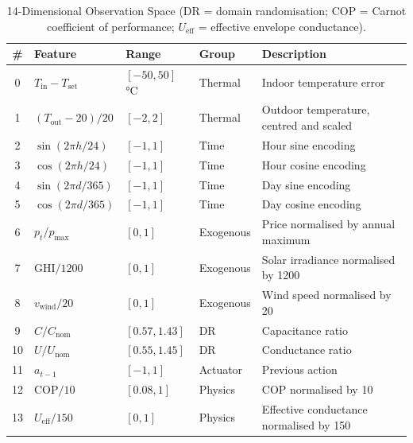 \documentclass[conference]{IEEEtran}
\begin{document}
\begin{table}[!t]
  \centering
  \small
  \caption{14-Dimensional Observation Space (DR = domain randomisation;
  COP = Carnot coefficient of performance;
  $U_{\text{eff}}$ = effective envelope conductance).}
  \label{tab:obs}
  \begin{tabular}{cllll}
    \toprule
    \textbf{\#} & \textbf{Feature} & \textbf{Range} & \textbf{Group} & \textbf{Description} \\
    \midrule
    0  & $T_{\text{in}} - T_{\text{set}}$  & $[-50,50]$\,\si{\degreeCelsius}  & Thermal   & Indoor temperature error \\
    1  & $(T_{\text{out}}-20)/20$           & $[-2,2]$                          & Thermal   & Outdoor temperature, centred and scaled \\
    2  & $\sin(2\pi h/24)$                  & $[-1,1]$                          & Time      & Hour sine encoding \\
    3  & $\cos(2\pi h/24)$                  & $[-1,1]$                          & Time      & Hour cosine encoding \\
    4  & $\sin(2\pi d/365)$                 & $[-1,1]$                          & Time      & Day sine encoding \\
    5  & $\cos(2\pi d/365)$                 & $[-1,1]$                          & Time      & Day cosine encoding \\
    6  & $p_t / p_{\max}$                   & $[0,1]$                           & Exogenous & Price normalised by annual maximum \\
    7  & GHI$/1200$                          & $[0,1]$                           & Exogenous & Solar irradiance normalised by 1200 \\
    8  & $v_{\text{wind}}/20$               & $[0,1]$                           & Exogenous & Wind speed normalised by 20 \\
    9  & $C / C_{\text{nom}}$               & $[0.57,1.43]$                     & DR        & Capacitance ratio \\
    10 & $U / U_{\text{nom}}$               & $[0.55,1.45]$                     & DR        & Conductance ratio \\
    11 & $a_{t-1}$                           & $[-1,1]$                          & Actuator  & Previous action \\
    12 & COP$/10$                            & $[0.08,1]$                        & Physics   & COP normalised by 10 \\
    13 & $U_{\text{eff}}/150$               & $[0,1]$                           & Physics   & Effective conductance normalised by 150 \\
    \bottomrule
  \end{tabular}
\end{table}
\end{document}
